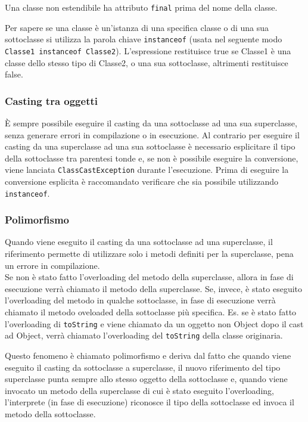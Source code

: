\documentclass[a4paper]{article}
\begin{document}
Una classe non estendibile ha attributo \verb|final| prima del nome della classe.

Per sapere se una classe è un'istanza di una specifica classe o di una sua sottoclasse si utilizza la parola chiave \verb|instanceof|
(usata nel seguente modo \verb|Classe1 instanceof Classe2|). L'espressione restituisce true se Classe1 è una classe dello stesso tipo di Classe2, o una sua
sottoclasse, altrimenti restituisce false.

\newpage


\subsubsection*{Casting tra oggetti}
È sempre possibile eseguire il casting da una sottoclasse ad una sua superclasse, senza generare errori in compilazione o in esecuzione.
Al contrario per eseguire il casting da una superclasse ad una sua sottoclasse è necessario esplicitare il tipo della sottoclasse tra
parentesi tonde e, se non è possibile eseguire la conversione, viene lanciata \verb|ClassCastException| durante l'esecuzione.
Prima di eseguire la conversione esplicita è raccomandato verificare che sia possibile utilizzando \verb|instanceof|.

\subsubsection*{Polimorfismo}
Quando viene eseguito il casting da una sottoclasse ad una superclasse, il  riferimento permette di utilizzare solo i metodi
definiti per la superclasse, pena un errore in compilazione. \\
Se non è stato fatto l'overloading del metodo della superclasse, allora in fase di esecuzione verrà chiamato il metodo della superclasse.
Se, invece, è stato eseguito l'overloading del metodo in qualche sottoclasse, in fase di esecuzione verrà chiamato il metodo oveloaded
della sottoclasse più specifica.
Es. se è stato fatto l'overloading di \verb|toString| e viene chiamato da un oggetto non Object dopo il cast ad Object, verrà chiamato
l'overloading del \verb|toString| della classe originaria.

Questo fenomeno è chiamato polimorfismo e deriva dal fatto che quando viene eseguito il casting da sottoclasse a superclasse, il nuovo
riferimento del tipo superclasse punta sempre allo stesso oggetto della sottoclasse e, quando viene invocato un metodo della superclasse
di cui è stato eseguito l'overloading, l'interprete (in fase di esecuzione) riconosce il tipo della sottoclasse ed invoca il metodo
della sottoclasse.
\end{document}
